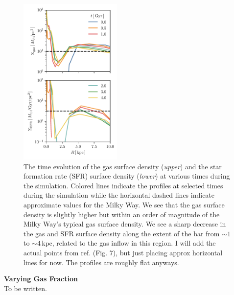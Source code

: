 \documentclass{natureprintstyle}
\begin{document}
\begin{figure}[h]%
\centering
\includegraphics[width=0.45\textwidth]{fig/fig-surf.pdf}
\caption{The time evolution of the gas surface density (\textit{upper}) and
the star formation rate (SFR) surface density (\textit{lower}) at various
times during the simulation. Colored lines indicate the profiles at selected
times during the simulation while the horizontal dashed lines indicate
approximate values for the Milky Way.\cite{2012ARAA..50..531K} We see that the
gas surface density is slightly higher but within an order of magnitude of the
Milky Way's typical gas surface density. We see a sharp decrease in the gas
and SFR surface density along the extent of the bar from $\sim1$ to
$\sim4\,\textrm{kpc}$, related to the gas inflow in this region. {\color{red}
I will add the actual points from ref.\cite{2012ARAA..50..531K} (Fig. 7), but
just placing approx horizontal lines for now. The profiles are roughly flat
anyways.}}
\label{fig:surf}
\end{figure}

\vspace{12pt}

\noindent
{\bf Varying Gas Fraction}
\\
\noindent
To be written.

\vspace{12pt}
\end{document}
